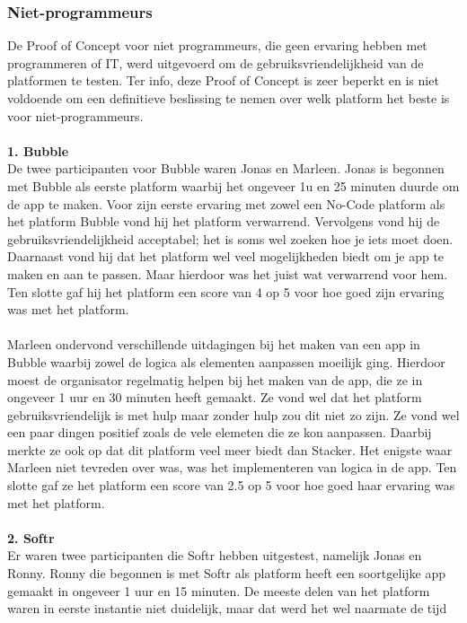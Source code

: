 \subsubsection{Niet-programmeurs}%
\label{subsubsec:niet-programmeurs}
De Proof of Concept voor niet programmeurs, die geen ervaring hebben met programmeren of IT, werd uitgevoerd om 
de gebruiksvriendelijkheid van de platformen te testen. Ter info, deze Proof of Concept is zeer beperkt en is niet voldoende om een definitieve beslissing te nemen over welk platform het beste is voor niet-programmeurs.
\\
\\
\textbf{1. Bubble}
\\
De twee participanten voor Bubble waren Jonas en Marleen. Jonas is begonnen met Bubble als eerste platform waarbij het ongeveer 1u en 25 minuten duurde om de app te maken.
Voor zijn eerste ervaring met zowel een No-Code platform als het platform Bubble vond hij het platform verwarrend. Vervolgens vond hij de gebruiksvriendelijkheid acceptabel; het is soms
wel zoeken hoe je iets moet doen. Daarnaast vond hij dat het platform wel veel mogelijkheden biedt om je app te maken en aan te passen. Maar hierdoor was het juist wat verwarrend voor hem.
Ten slotte gaf hij het platform een score van 4 op 5 voor hoe goed zijn ervaring was met het platform.
\\
\\
Marleen ondervond verschillende uitdagingen bij het maken van een app in Bubble waarbij zowel de logica als elementen aanpassen moeilijk ging. Hierdoor moest de organisator
regelmatig helpen bij het maken van de app, die ze in ongeveer 1 uur en 30 minuten heeft gemaakt. Ze vond wel dat het platform gebruiksvriendelijk is met hulp maar zonder hulp zou dit niet zo zijn. Ze vond wel een paar dingen positief zoals de vele elemeten die ze kon aanpassen. Daarbij merkte ze ook op 
dat dit platform veel meer biedt dan Stacker. Het enigste waar Marleen niet tevreden over was, was het implementeren van logica in de app. Ten slotte gaf ze het platform een score van 2.5 op 5 voor hoe goed haar ervaring was met het platform.
\\
\\
\textbf{2. Softr}
\\
Er waren twee participanten die Softr hebben uitgestest, namelijk Jonas en Ronny. Ronny die begonnen is met Softr als platform heeft een soortgelijke app
gemaakt in ongeveer 1 uur en 15 minuten. De meeste delen van het platform waren in eerste instantie niet duidelijk, maar dat werd het wel naarmate de tijd
